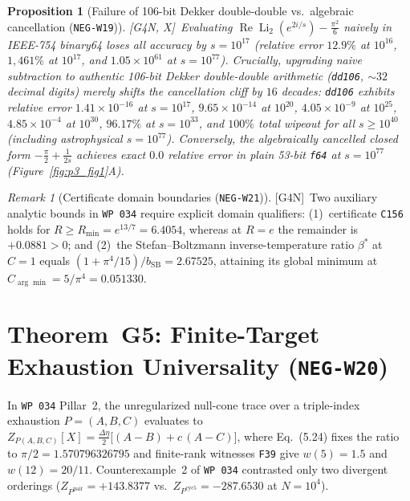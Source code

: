 \documentclass[11pt]{amsart}
\numberwithin{equation}{section}
\theoremstyle{plain}
\newtheorem{proposition}[theorem]{Proposition}
\theoremstyle{definition}\newtheorem{definition}[theorem]{Definition}
\theoremstyle{remark}\newtheorem{remark}[theorem]{Remark}
\newcommand{\ctag}[1]{\textup{\textsf{\scriptsize[#1]}}}
\begin{document}
\begin{proposition}[Failure of 106-bit Dekker double-double vs.\ algebraic cancellation (\texttt{NEG-W19})]\label{prop:dd_wipeout}
\ctag{G4N, X}\ Evaluating $\operatorname{Re}\operatorname{Li}_2(e^{2i/s}) - \frac{\pi^2}{6}$ naively in IEEE-754 binary64 loses all accuracy by $s = 10^{17}$ (relative error $12.9\%$ at $10^{16}$, $1{,}461\%$ at $10^{17}$, and $1.05\times 10^{61}$ at $s = 10^{77}$). Crucially, upgrading naive subtraction to authentic 106-bit Dekker double-double arithmetic \cite{dekker1971} (\texttt{dd106}, $\sim 32$ decimal digits) merely shifts the cancellation cliff by $16$ decades: \texttt{dd106} exhibits relative error $1.41\times 10^{-16}$ at $s=10^{17}$, $9.65\times 10^{-14}$ at $10^{20}$, $4.05\times 10^{-9}$ at $10^{25}$, $4.85\times 10^{-4}$ at $10^{30}$, $96.17\%$ at $s=10^{33}$, and $100\%$ total wipeout for all $s \ge 10^{40}$ (including astrophysical $s = 10^{77}$). Conversely, the algebraically cancelled closed form $-\frac{\pi}{2} + \frac{1}{2s}$ achieves exact $0.0$ relative error in plain 53-bit \texttt{f64} at $s = 10^{77}$ (Figure~\ref{fig:p3_fig1}A).
\end{proposition}

\begin{remark}[Certificate domain boundaries (\texttt{NEG-W21})]
\ctag{G4N}\ Two auxiliary analytic bounds in \texttt{WP~034} require explicit domain qualifiers: (1)~certificate \texttt{C156} holds for $R \ge R_{\min} = e^{13/7} = 6.4054$, whereas at $R = e$ the remainder is $+0.0881 > 0$; and (2)~the Stefan--Boltzmann inverse-temperature ratio $\beta^*$ at $C = 1$ equals $(1 + \pi^4/15)/b_{\mathrm{SB}} = 2.67525$, attaining its global minimum at $C_{\arg\min} = 5/\pi^4 = 0.051330$.
\end{remark}

\section{Theorem~G5: Finite-Target Exhaustion Universality (\texttt{NEG-W20})}
In \texttt{WP~034} Pillar~2, the unregularized null-cone trace over a triple-index exhaustion $P = (A, B, C)$ evaluates to $Z_{P(A,B,C)}[X] = \frac{\Delta\eta}{2}\bigl[(A - B) + c\,(A - C)\bigr]$, where Eq.~(5.24) fixes the ratio to $\pi/2 = 1.570796326795$ and finite-rank witnesses \texttt{F39} give $w(5) = 1.5$ and $w(12) = 20/11$. Counterexample~2 of \texttt{WP~034} contrasted only two divergent orderings ($Z_{P^{\mathrm{pair}}} = +143.8377$ vs.\ $Z_{P^{\mathrm{cyc5}}} = -287.6530$ at $N = 10^4$).
\end{document}
